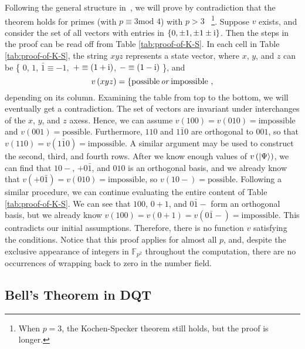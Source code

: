 \documentclass[english,12pt]{iopart}
\makeatletter
\theoremstyle{plain}
\newenvironment{proof}[1][\protect\proofname]{\par
\normalfont\topsep6\p@\@plus6\p@\relax
\trivlist
\itemindent\parindent
\item[\hskip\labelsep\scshape #1]\ignorespaces
}{%
\endtrivlist\@endpefalse
}
\providecommand{\proofname}{Proof}
\theoremstyle{definition}
\newcommand{\ff}[1]{\mathbb{F}_{#1}}
\newcommand{\mod}{\mbox{mod }}
\makeatother
\begin{document}
\begin{proof}

  Following the general structure in~\cite{peres1995quantum}, we will
  prove by contradiction that the theorem holds for primes (with
  $p \equiv 3 \mod 4$) with $p > 3$ ~\footnote{\label{fn:p>3}When
    $p=3$, the Kochen-Specker theorem still holds, but the proof is
    longer.}. Suppose $v$ exists, and consider the set of all vectors
  with entries in $\left\{ 0,\pm1,\pm1\pm\mathrm{i}\right\} $. Then the
  steps in the proof can be read off from Table
  \ref{tab:proof-of-K-S}.  In each cell in Table
  \ref{tab:proof-of-K-S}, the string $xyz$ represents a state vector,
  where $x$, $y$, and $z$ can be \{ $0$, $1$, $\bar{1}\equiv -1,$
  ${+} \equiv (1+\mathrm{i})$, ${-} \equiv (1-\mathrm{i})$ \}, and
\[
v\left( xyz \right)= \{\textrm{possible}\, \mbox{\it or\/}\,
\textrm{impossible} \ , \]
depending on its column.  Examining the table from top to the bottom,
we will eventually get a contradiction.  The set of vectors are
invariant under interchanges of the $x$, $y$, and $z$ axess.  Hence,
we can assume
$v\left(100\right)=v\left(010\right)=\textrm{impossible}$ and
$v\left(001\right)=\textrm{possible}$.  Furthermore, $110$ and
$1\bar{1}0$ are orthogonal to $001$, so that
$v\left(110\right)=v\left(1\bar{1}0\right)=\textrm{impossible}$.  A
similar argument may be used to construct the second, third, and
fourth rows.  After we know enough values of
$v\left({\left\vert{\Psi}\right\rangle}\right)$, we can find that $10{-}$, ${+}0\bar{1}$,
and $010$ is an orthogonal basis, and we already know that
$v\left({+}0\bar{1}\right)=v\left(010\right)=\textrm{impossible}$, so
$v\left(10{-}\right)=\textrm{possible}$.  Following a similar
procedure, we can continue evaluating the entire content of Table
\ref{tab:proof-of-K-S}.  We can see that $100$, $0{+}1$, and
$0\bar{1}{-}$ form an orthogonal basis, but we already know
$v\left(100\right)=v\left(0{+}1\right)=v\left(0\bar{1}{-}\right)
=\textrm{impossible}$.
This contradicts our initial assumptions. Therefore, there is no
function $v$ satisfying the conditions.
\end{proof}
Notice that this proof applies for almost all $p$, and, despite
the exclusive appearance of integers in $\ff{p^{2}}$ throughout the
computation, there are no occurrences of wrapping back to zero in the
number field.

\subsection {Bell's Theorem in DQT}
\end{document}
